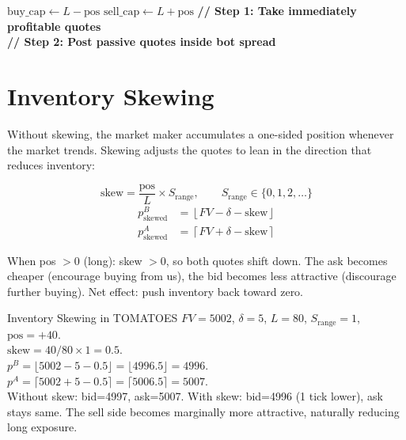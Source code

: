 \documentclass[12pt,a4paper,openany]{report}
\theoremstyle{definition}
\newcommand{\floor}[1]{\left\lfloor#1\right\rfloor}
\newcommand{\ceil}[1]{\left\lceil#1\right\rceil}
\begin{document}
\begin{algorithm}[H]
\caption{Market-Making Algorithm (per iteration)}
\SetAlgoLined
{}
$\text{buy\_cap} \leftarrow L - \text{pos}$\;
$\text{sell\_cap} \leftarrow L + \text{pos}$\;
\textbf{// Step 1: Take immediately profitable quotes}\\
\textbf{// Step 2: Post passive quotes inside bot spread}\\
\end{algorithm}

\section{Inventory Skewing}

Without skewing, the market maker accumulates a one-sided position whenever the market trends. Skewing adjusts the quotes to lean in the direction that reduces inventory:

\begin{equation}
  \text{skew} = \frac{\text{pos}}{L} \times S_{\text{range}}, \qquad S_{\text{range}} \in \{0, 1, 2, \ldots\}
\end{equation}
\begin{align}
  p^B_{\text{skewed}} &= \floor{FV - \delta - \text{skew}} \\
  p^A_{\text{skewed}} &= \ceil{FV + \delta - \text{skew}}
\end{align}

When pos $> 0$ (long): skew $> 0$, so both quotes shift down. The ask becomes cheaper (encourage buying from us), the bid becomes less attractive (discourage further buying). Net effect: push inventory back toward zero.

\begin{examplebox}{Inventory Skewing in TOMATOES}
$FV = 5002$, $\delta = 5$, $L = 80$, $S_{\text{range}} = 1$, $\text{pos} = +40$. \\
$\text{skew} = 40/80 \times 1 = 0.5$. \\
$p^B = \lfloor 5002 - 5 - 0.5 \rfloor = \lfloor 4996.5 \rfloor = 4996$. \\
$p^A = \lceil 5002 + 5 - 0.5 \rceil = \lceil 5006.5 \rceil = 5007$. \\
Without skew: bid=4997, ask=5007. With skew: bid=4996 (1 tick lower), ask stays same. The sell side becomes marginally more attractive, naturally reducing long exposure.
\end{examplebox}
\end{document}
